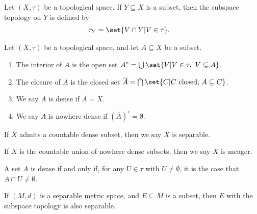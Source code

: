 \begin{definition}
Let $\left(X,\tau\right)$ be a topological space. If $Y\subseteq X$ is a subset, then the subspace topology on $Y$ is defined by
\begin{align*}
  \tau_{Y} &= \set{V\cap Y | V\in \tau}.
\end{align*}

\end{definition}
\begin{definition}
  Let $\left(X,\tau\right)$ be a topological space, and let $A\subseteq X$ be a subset.
  \begin{enumerate}[(1)]
    \item The interior of $A$ is the open set $A^{\circ} = \bigcup\set{V | V\in\tau,~V\subseteq A}$.
    \item The closure of $A$ is the closed set $\overline{A} = \bigcap\set{C| C\text{ closed, }A\subseteq C}$.
    \item We say $A$ is dense if $\overline{A} = X$.
    \item We say $A$ is nowhere dense if $\left(\overline{A}\right)^{\circ} = \emptyset$.
  \end{enumerate}
  If $X$ admits a countable dense subset, then we say $X$ is separable.\newline

  If $X$ is the countable union of nowhere dense subsets, then we say $X$ is meager.
\end{definition}
\begin{remark}
  A set $A$ is dense if and only if, for any $U\in \tau$ with $U\neq \emptyset$, it is the case that $A\cap U \neq \emptyset$.
\end{remark}
\begin{fact}
  If $\left(M,d\right)$ is a separable metric space, and $E\subseteq M$ is a subset, then $E$ with the subspace topology is also separable.
\end{fact}
